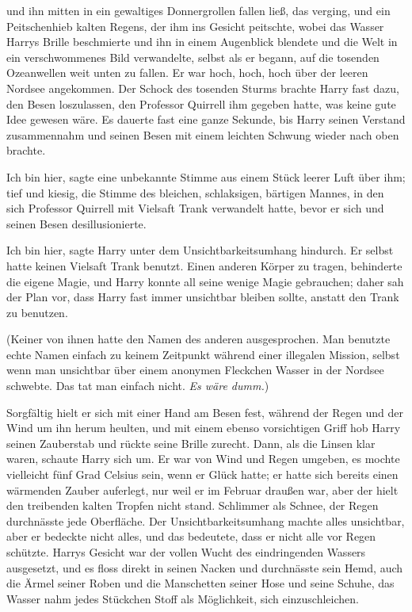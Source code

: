 und ihn mitten in ein gewaltiges Donnergrollen fallen ließ, das verging, und ein
Peitschenhieb kalten Regens, der ihm ins Gesicht peitschte, wobei das Wasser
Harrys Brille beschmierte und ihn in einem Augenblick blendete und die Welt in
ein verschwommenes Bild verwandelte, selbst als er begann, auf die tosenden
Ozeanwellen weit unten zu fallen. Er war hoch, hoch, hoch über der leeren
Nordsee angekommen. Der Schock des tosenden Sturms brachte Harry fast dazu, den
Besen loszulassen, den Professor Quirrell ihm gegeben hatte, was keine gute Idee
gewesen wäre. Es dauerte fast eine ganze Sekunde, bis Harry seinen Verstand
zusammennahm und seinen Besen mit einem leichten Schwung wieder nach oben
brachte.

\glqq Ich bin hier\grqq{}, sagte eine unbekannte Stimme aus einem Stück leerer
Luft über ihm; tief und kiesig, die Stimme des bleichen, schlaksigen, bärtigen
Mannes, in den sich Professor Quirrell mit Vielsaft Trank verwandelt hatte,
bevor er sich und seinen Besen desillusionierte.

\glqq Ich bin hier\grqq{}, sagte Harry unter dem Unsichtbarkeitsumhang hindurch.
Er selbst hatte keinen Vielsaft Trank benutzt. Einen anderen Körper zu tragen,
behinderte die eigene Magie, und Harry konnte all seine wenige Magie gebrauchen;
daher sah der Plan vor, dass Harry fast immer unsichtbar bleiben sollte, anstatt
den Trank zu benutzen.

(Keiner von ihnen hatte den Namen des anderen ausgesprochen. Man benutzte echte
Namen einfach zu keinem Zeitpunkt während einer illegalen Mission, selbst wenn
man unsichtbar über einem anonymen Fleckchen Wasser in der Nordsee schwebte. Das
tat man einfach nicht. \emph{Es wäre dumm.})

Sorgfältig hielt er sich mit einer Hand am Besen fest, während der Regen und der
Wind um ihn herum heulten, und mit einem ebenso vorsichtigen Griff hob Harry
seinen Zauberstab und rückte seine Brille zurecht. Dann, als die Linsen klar
waren, schaute Harry sich um. Er war von Wind und Regen umgeben, es mochte
vielleicht fünf Grad Celsius sein, wenn er Glück hatte; er hatte sich bereits
einen wärmenden Zauber auferlegt, nur weil er im Februar draußen war, aber der
hielt den treibenden kalten Tropfen nicht stand. Schlimmer als Schnee, der Regen
durchnässte jede Oberfläche. Der Unsichtbarkeitsumhang machte alles unsichtbar,
aber er bedeckte nicht alles, und das bedeutete, dass er nicht alle vor Regen
schützte. Harrys Gesicht war der vollen Wucht des eindringenden Wassers
ausgesetzt, und es floss direkt in seinen Nacken und durchnässte sein Hemd, auch
die Ärmel seiner Roben und die Manschetten seiner Hose und seine Schuhe, das
Wasser nahm jedes Stückchen Stoff als Möglichkeit, sich einzuschleichen.

